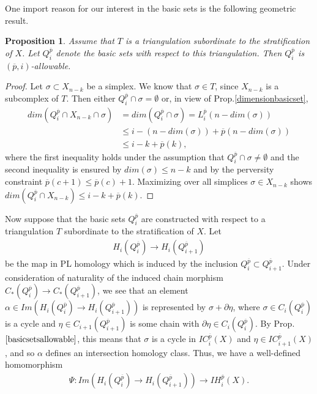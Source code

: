 \documentclass{scrreprt}
\newtheorem{prop}{Proposition}[chapter]
\begin{document}
One import reason for our interest in the basic sets is the following geometric result.

\begin{prop}\label{basicsetsallowable}
Assume that $T$ is a triangulation subordinate to the stratification of $X$. Let $Q_i^{\overline{p}}$
denote the basic sets with respect to this triangulation. Then $Q_i^{\overline{p}}$ is $(\overline{p},i)$-allowable.
\end{prop}

\begin{proof}
Let $\sigma \subset X_{n-k}$ be a simplex. We know that $\sigma \in T$, since $X_{n-k}$ is a subcomplex of $T$. Then either $Q_i^{\overline{p}} \cap \sigma= \emptyset$ or, in view of Prop.\ref{dimensionbasicset},
\begin{align*}
dim(Q_i^{\overline{p}} \cap X_{n-k} \cap \sigma) &=dim(Q_i^{\overline{p}} \cap \sigma)=L_i^{\overline{p}}(n-dim(\sigma)) \\ &\leq i - (n- dim(\sigma))+ \overline{p}(n-dim(\sigma)) \\ &\leq i-k+ \overline{p}(k),
\end{align*}
where the first inequality holds under the assumption that $Q_i^{\overline{p}} \cap \sigma \neq \emptyset$ and the second inequality is ensured by $dim(\sigma) \leq n-k$ and by the perversity constraint $\overline{p}(c+1) \leq \overline{p}(c)+1$. Maximizing over all simplices $\sigma \in X_{n-k}$ shows
$dim(Q_i^{\overline{p}} \cap X_{n-k} ) \leq i-k+ \overline{p}(k).$
\end{proof}

Now suppose that the basic sets $Q_i^{\overline{p}}$ are constructed with respect to a triangulation $T$ subordinate to the stratification of $X$. Let 
\begin{align*}
H_i(Q_{i}^{\overline{p}}) \to H_i(Q_{i+1}^{\overline{p}})
\end{align*}
be the map in PL homology which is induced by the inclusion $Q_i^{\overline{p}} \subset Q_{i+1}^{\overline{p}}$. Under consideration of naturality of the induced chain morphism $C_*(Q_i^{\overline{p}}) \to C_*(Q_{i+1}^{\overline{p}})$, we see that an element $\alpha \in Im(H_i(Q_{i}^{\overline{p}}) \to H_i(Q_{i+1}^{\overline{p}}))$ is represented by $\sigma+ \partial \eta$, where $\sigma \in C_i(Q_i^{\overline{p}})$ is a cycle and $\eta \in  C_{i+1}(Q_{i+1}^{\overline{p}})$
is some chain with $\partial \eta \in C_i(Q_i^{\overline{p}})$. By Prop.$\ref{basicsetsallowable}$, this means that $\sigma$ is a cycle in $IC_i^{\overline{p}}(X)$ and $\eta \in IC_{i+1}^{\overline{p}}(X)$, and so $\alpha$ defines an intersection homology class. Thus, we have a well-defined homomorphism
\begin{align*}
\Psi: Im(H_i(Q_{i}^{\overline{p}}) \to H_i(Q_{i+1}^{\overline{p}})) \to IH_i^{\overline{p}}(X).
\end{align*}
\end{document}
